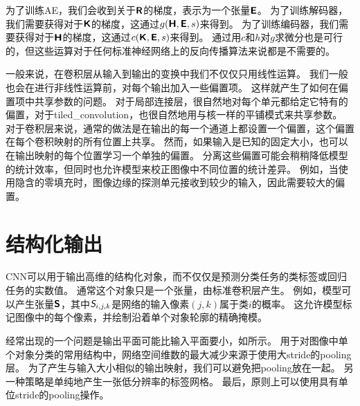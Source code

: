 为了训练\gls{AE}，我们会收到关于$\textsf{\textbf{R}}$的梯度，表示为一个张量$\textsf{\textbf{E}}$。
为了训练解码器，我们需要获得对于$\textsf{\textbf{K}}$的梯度，这通过$g(\textsf{\textbf{H}}, \textsf{\textbf{E}}, s)$来得到。
为了训练编码器，我们需要获得对于$\textsf{\textbf{H}}$的梯度，这通过$c(\textsf{\textbf{K}}, \textsf{\textbf{E}}, s)$来得到。
通过用$c$和$h$对$g$求微分也是可行的，但这些运算对于任何标准神经网络上的反向传播算法来说都是不需要的。
 
 
一般来说，在卷积层从输入到输出的变换中我们不仅仅只用线性运算。
我们一般也会在进行非线性运算前，对每个输出加入一些偏置项。
这样就产生了如何在偏置项中共享参数的问题。
对于局部连接层，很自然地对每个单元都给定它特有的偏置，对于\gls{tiled_convolution}，也很自然地用与核一样的平铺模式来共享参数。
对于卷积层来说，通常的做法是在输出的每一个通道上都设置一个偏置，这个偏置在每个卷积映射的所有位置上共享。
然而，如果输入是已知的固定大小，也可以在输出映射的每个位置学习一个单独的偏置。
分离这些偏置可能会稍稍降低模型的统计效率，但同时也允许模型来校正图像中不同位置的统计差异。
例如，当使用隐含的零填充时，图像边缘的探测单元接收到较少的输入，因此需要较大的偏置。

\section{结构化输出}
\label{sec:structured_outputs}

\gls{CNN}可以用于输出高维的结构化对象，而不仅仅是预测分类任务的类标签或回归任务的实数值。
通常这个对象只是一个张量，由标准卷积层产生。
例如，模型可以产生张量$\textsf{\textbf{S}}$，其中$\textit{\textsf{S}}_{i,j,k}$是网络的输入像素$(j, k)$属于类$i$的概率。
这允许模型标记图像中的每个像素，并绘制沿着单个对象轮廓的精确掩模。

经常出现的一个问题是输出平面可能比输入平面要小，如所示。
用于对图像中单个对象分类的常用结构中，网络空间维数的最大减少来源于使用大\gls{stride}的\gls{pooling}层。
为了产生与输入大小相似的输出映射，我们可以避免把\gls{pooling}放在一起\citep{jain2007supervised}。
另一种策略是单纯地产生一张低分辨率的标签网格\citep{Pinheiro+Collobert-ICML2014,Pinheiro+Collobert-CVPR2015}。
最后，原则上可以使用具有单位\gls{stride}的\gls{pooling}操作。

